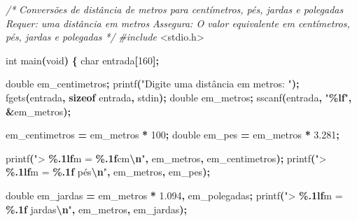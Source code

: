 \documentclass[
  11pt,
  a4paper,
]{scrbook}
\newenvironment{Shaded}{\begin{snugshade}}{\end{snugshade}}
\newcommand{\CommentTok}[1]{\textcolor[rgb]{0.56,0.35,0.01}{\textit{#1}}}
\newcommand{\DataTypeTok}[1]{\textcolor[rgb]{0.13,0.29,0.53}{#1}}
\newcommand{\DecValTok}[1]{\textcolor[rgb]{0.00,0.00,0.81}{#1}}
\newcommand{\FloatTok}[1]{\textcolor[rgb]{0.00,0.00,0.81}{#1}}
\newcommand{\ImportTok}[1]{#1}
\newcommand{\KeywordTok}[1]{\textcolor[rgb]{0.13,0.29,0.53}{\textbf{#1}}}
\newcommand{\NormalTok}[1]{#1}
\newcommand{\OperatorTok}[1]{\textcolor[rgb]{0.81,0.36,0.00}{\textbf{#1}}}
\newcommand{\PreprocessorTok}[1]{\textcolor[rgb]{0.56,0.35,0.01}{\textit{#1}}}
\newcommand{\SpecialCharTok}[1]{\textcolor[rgb]{0.81,0.36,0.00}{\textbf{#1}}}
\newcommand{\StringTok}[1]{\textcolor[rgb]{0.31,0.60,0.02}{#1}}
\begin{document}
\begin{Shaded}
\begin{Highlighting}[]
\CommentTok{/*}
\CommentTok{Conversões de distância de metros para centímetros, pés, jardas e polegadas}
\CommentTok{Requer: uma distância em metros}
\CommentTok{Assegura: O valor equivalente em centímetros, pés, jardas e polegadas}
\CommentTok{*/}
\PreprocessorTok{\#include }\ImportTok{\textless{}stdio.h\textgreater{}}

\DataTypeTok{int}\NormalTok{ main}\OperatorTok{(}\DataTypeTok{void}\OperatorTok{)} \OperatorTok{\{}
    \DataTypeTok{char}\NormalTok{ entrada}\OperatorTok{[}\DecValTok{160}\OperatorTok{];}

    \DataTypeTok{double}\NormalTok{ em\_centimetros}\OperatorTok{;}
\NormalTok{    printf}\OperatorTok{(}\StringTok{"Digite uma distância em metros: "}\OperatorTok{);}
\NormalTok{    fgets}\OperatorTok{(}\NormalTok{entrada}\OperatorTok{,} \KeywordTok{sizeof}\NormalTok{ entrada}\OperatorTok{,}\NormalTok{ stdin}\OperatorTok{);}
    \DataTypeTok{double}\NormalTok{ em\_metros}\OperatorTok{;}
\NormalTok{    sscanf}\OperatorTok{(}\NormalTok{entrada}\OperatorTok{,} \StringTok{"}\SpecialCharTok{\%lf}\StringTok{"}\OperatorTok{,} \OperatorTok{\&}\NormalTok{em\_metros}\OperatorTok{);}

\NormalTok{    em\_centimetros }\OperatorTok{=}\NormalTok{ em\_metros }\OperatorTok{*} \DecValTok{100}\OperatorTok{;}
    \DataTypeTok{double}\NormalTok{ em\_pes }\OperatorTok{=}\NormalTok{ em\_metros }\OperatorTok{*} \FloatTok{3.281}\OperatorTok{;}
 
\NormalTok{    printf}\OperatorTok{(}\StringTok{"\textgreater{} }\SpecialCharTok{\%.1lf}\StringTok{m = }\SpecialCharTok{\%.1f}\StringTok{cm}\SpecialCharTok{\textbackslash{}n}\StringTok{"}\OperatorTok{,}\NormalTok{ em\_metros}\OperatorTok{,}\NormalTok{ em\_centimetros}\OperatorTok{);}
\NormalTok{    printf}\OperatorTok{(}\StringTok{"\textgreater{} }\SpecialCharTok{\%.1lf}\StringTok{m = }\SpecialCharTok{\%.1f}\StringTok{ pés}\SpecialCharTok{\textbackslash{}n}\StringTok{"}\OperatorTok{,}\NormalTok{ em\_metros}\OperatorTok{,}\NormalTok{ em\_pes}\OperatorTok{);}

    \DataTypeTok{double}\NormalTok{ em\_jardas }\OperatorTok{=}\NormalTok{ em\_metros }\OperatorTok{*} \FloatTok{1.094}\OperatorTok{,}\NormalTok{ em\_polegadas}\OperatorTok{;}
\NormalTok{    printf}\OperatorTok{(}\StringTok{"\textgreater{} }\SpecialCharTok{\%.1lf}\StringTok{m = }\SpecialCharTok{\%.1f}\StringTok{ jardas}\SpecialCharTok{\textbackslash{}n}\StringTok{"}\OperatorTok{,}\NormalTok{ em\_metros}\OperatorTok{,}\NormalTok{ em\_jardas}\OperatorTok{);}


\end{Highlighting}
\end{Shaded}
\end{document}
